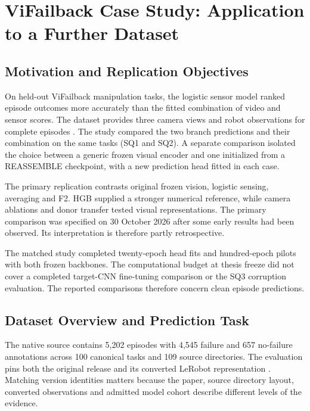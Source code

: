 \chapter{ViFailback Case Study: Application to a Further Dataset}
\label{ch:vifailback}

\section{Motivation and Replication Objectives}
On held-out ViFailback manipulation tasks, the logistic sensor model ranked episode outcomes more accurately than the fitted combination of video and sensor scores. The dataset provides three camera views and robot observations for complete episodes \citep{Zeng2026ViFailback}. The study compared the two branch predictions and their combination on the same tasks (SQ1 and SQ2). A separate comparison isolated the choice between a generic frozen visual encoder and one initialized from a REASSEMBLE checkpoint, with a new prediction head fitted in each case.

The primary replication contrasts original frozen vision, logistic sensing, averaging and F2. HGB supplied a stronger numerical reference, while camera ablations and donor transfer tested visual representations. The primary comparison was specified on 30 October 2026 after some early results had been observed. Its interpretation is therefore partly retrospective.

The matched study completed twenty-epoch head fits and hundred-epoch pilots with both frozen backbones. The computational budget at thesis freeze did not cover a completed target-CNN fine-tuning comparison or the SQ3 corruption evaluation. The reported comparisons therefore concern clean episode predictions.

\section{Dataset Overview and Prediction Task}
The native source contains 5,202 episodes with 4,545 failure and 657 no-failure annotations across 100 canonical tasks and 109 source directories. The evaluation pins both the original release and its converted LeRobot representation \citep{ViFailbackHF2025}. Matching version identities matters because the paper, source directory layout, converted observations and admitted model cohort describe different levels of the evidence.

